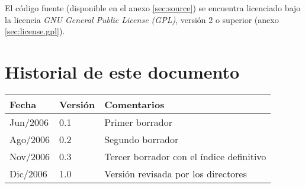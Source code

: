 \documentclass[spanish,a4paper,12pt,twosides]{book}
\begin{document}
El código fuente (disponible en el anexo \ref{sec:source}) se encuentra 
licenciado bajo la licencia \emph{GNU General Public License (GPL)}, 
versión 2 o superior (anexo \ref{sec:license.gpl}).

\chapter*{Historial de este documento}

\begin{tabular}{|l|l|l|}
 \hline
 \textbf{Fecha} & \textbf{Versión} & \textbf{Comentarios} \\\hline
 Jun/2006 & 0.1 & Primer borrador \\\hline
 Ago/2006 & 0.2 & Segundo borrador \\\hline
 Nov/2006 & 0.3 & Tercer borrador con el índice definitivo \\\hline
 Dic/2006 & 1.0 & Versión revisada por los directores \\\hline
\end{tabular}

\tableofcontents

\newpage

\listoffigures

\newpage

\listoftables

\newpage

\mainmatter









\appendix




\end{document}
